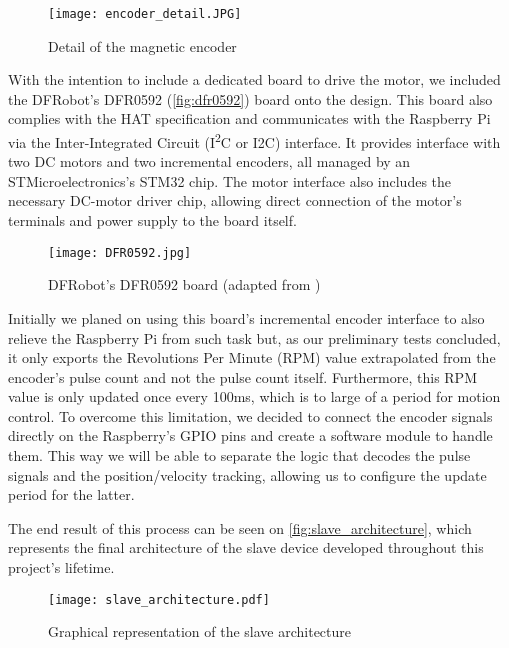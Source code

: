 \begin{figure}[htp]
	\centering
	\texttt{[image: encoder\_detail.JPG]}
	\caption{Detail of the magnetic encoder}
	\label{fig:encoder_detail}
\end{figure}

With the intention to include a dedicated board to drive the motor, we included the DFRobot's DFR0592 \cite{hdw:dfr0592} (\autoref{fig:dfr0592}) board onto the design.
This board also complies with the HAT specification and communicates with the Raspberry Pi via the Inter-Integrated Circuit (I\textsuperscript{2}C or I2C) interface.
It provides interface with two DC motors and two incremental encoders, all managed by an STMicroelectronics's STM32 chip.
The motor interface also includes the necessary DC-motor driver chip, allowing direct connection of the motor's terminals and power supply to the board itself.

\begin{figure}[htp]
	\centering
	\texttt{[image: DFR0592.jpg]}
	\caption{DFRobot's DFR0592 board (adapted from \cite{hdw:dfr0592})}
	\label{fig:dfr0592}
\end{figure}

Initially we planed on using this board's incremental encoder interface to also relieve the Raspberry Pi from such task but, as our preliminary tests concluded, it only exports the Revolutions Per Minute (RPM) value extrapolated from the encoder's pulse count and not the pulse count itself.
Furthermore, this RPM value is only updated once every 100ms, which is to large of a period for motion control.
To overcome this limitation, we decided to connect the encoder signals directly on the Raspberry's GPIO pins and create a software module to handle them.
This way we will be able to separate the logic that decodes the pulse signals and the position/velocity tracking, allowing us to configure the update period for the latter.

The end result of this process can be seen on \autoref{fig:slave_architecture}, which represents the final architecture of the slave device developed throughout this project's lifetime.

\begin{figure}[htp]
	\centering
	\texttt{[image: slave\_architecture.pdf]}
	\caption{Graphical representation of the slave architecture}
	\label{fig:slave_architecture}
\end{figure}
